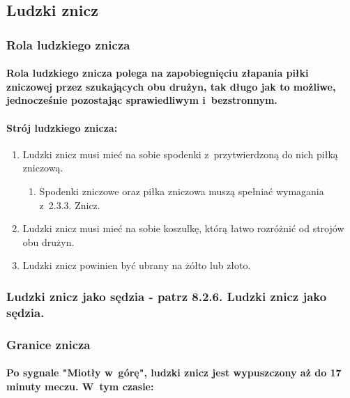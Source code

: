 \documentclass[12pt]{article}
\begin{document}
\subsection{Ludzki znicz}

\subsubsection{Rola ludzkiego znicza}

\paragraph{Rola ludzkiego znicza polega na zapobiegnięciu
	złapania piłki zniczowej przez szukających obu drużyn, tak długo jak to
	możliwe, jednocześnie pozostając sprawiedliwym i~bezstronnym.}

\paragraph{Strój ludzkiego znicza:}

\begin{enumerate}
	\item
	      Ludzki znicz musi mieć na sobie spodenki z~przytwierdzoną do nich
	      piłką zniczową.

	      \begin{enumerate}
		      \item
		            Spodenki zniczowe oraz piłka zniczowa muszą spełniać wymagania z~2.3.3. Znicz.
	      \end{enumerate}
	\item
	      Ludzki znicz musi mieć na sobie koszulkę, którą łatwo rozróżnić od
	      strojów obu drużyn.
	\item
	      Ludzki znicz powinien być ubrany na żółto lub złoto.
\end{enumerate}

\subsubsection{Ludzki znicz jako sędzia - patrz 8.2.6. Ludzki znicz jako sędzia.}

\subsubsection{Granice znicza}

\paragraph{Po sygnale "Miotły w~górę", ludzki znicz jest
	wypuszczony aż do 17 minuty meczu. W~tym czasie:}
\end{document}

